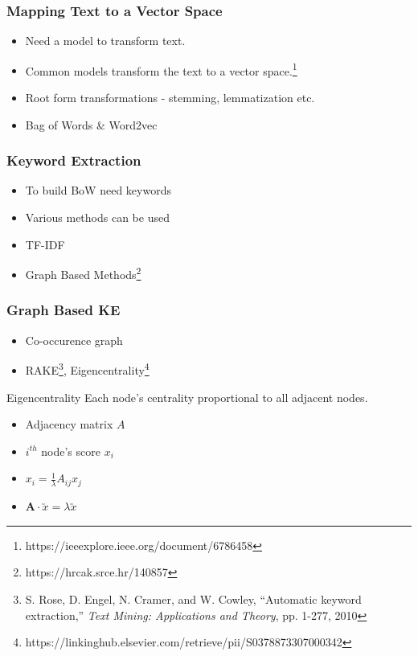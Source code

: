 \documentclass{beamer}
\begin{document}
\begin{frame}
    \frametitle{Mapping Text to a Vector Space}
    \begin{itemize}
        \item Need a model to transform text.
        \item Common models transform the text to a vector space.\footnote{https://ieeexplore.ieee.org/document/6786458}
        \item Root form transformations - stemming, lemmatization etc.
        \item Bag of Words \& Word2vec
    \end{itemize}
\end{frame}

\begin{frame}
    \frametitle{Keyword Extraction}
    \begin{itemize}
        \item To build BoW need keywords
        \item Various methods can be used
        \item TF-IDF
        \item Graph Based Methods\footnote{https://hrcak.srce.hr/140857}
    \end{itemize}
\end{frame}

\begin{frame}
    \frametitle{Graph Based KE}
    \begin{itemize}
        \item Co-occurence graph
        \item RAKE\footnote{ S. Rose, D. Engel, N. Cramer, and W. Cowley, 
        ``Automatic keyword extraction,'' \emph{Text Mining:
        Applications and Theory}, pp. 1-277, 2010}, Eigencentrality\footnote{https://linkinghub.elsevier.com/retrieve/pii/S0378873307000342}
    \end{itemize}
    \begin{block}{Eigencentrality}
        Each node's centrality proportional to all adjacent nodes.
        \begin{itemize}
            \item Adjacency matrix $A$ 
            \item $i^{th}$ node's score $x_i$ 
            \item $x_i = \frac{1}{\lambda}A_{ij}x_j$
            \item $\textbf{A}\cdot \utilde{x} = \lambda \utilde{x}$
        \end{itemize}

    \end{block}
\end{frame}
\end{document}
